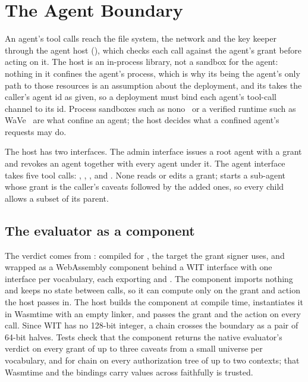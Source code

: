 \section{The Agent Boundary}\label{sec:host}

An agent's tool calls reach the file system, the network and the key keeper
through the agent host (), which checks each call
against the agent's grant before acting on it. The host is an in-process
library, not a sandbox for the agent: nothing in it confines the agent's
process, which is why its being the agent's only path to those resources is
an assumption about the deployment, and its 
takes the caller's agent id as given, so a deployment must bind each agent's
tool-call channel to its id. Process sandboxes such as
nono~\cite{nono} or a verified runtime such as WaVe~\cite{wave} are what
confine an agent; the host decides what a confined agent's requests may do.

The host has two interfaces. The admin interface issues a root agent with a
grant and revokes an agent together with every agent under
it. The agent interface takes five tool calls:
, , ,  and
. None reads or edits a grant;
 starts a sub-agent whose grant is the caller's caveats
followed by the added ones, so every child allows a subset of its
parent.

\subsection{The evaluator as a component}

The verdict comes from : 
compiled for , the target the grant signer uses, and
wrapped as a WebAssembly component behind a WIT interface with one interface
per vocabulary, each exporting  and . The
component imports nothing and keeps no state between calls, so it can compute
only on the grant and action the host passes in. The host builds the component
at compile time, instantiates it in Wasmtime with an empty linker, and passes
the grant and the action on every call. Since WIT has no 128-bit integer, a
chain  crosses the boundary as a pair of 64-bit halves. Tests check
that the component returns the native evaluator's verdict on every grant of up
to three caveats from a small universe per vocabulary, and for chain on every
authorization tree of up to two contexts; that
Wasmtime and the bindings carry values across faithfully is
trusted.

